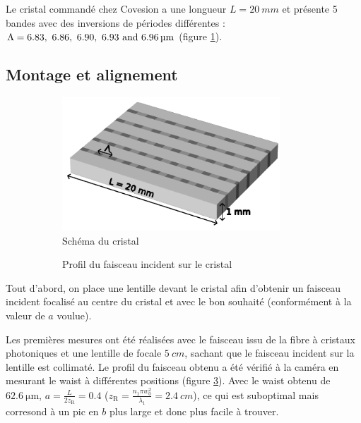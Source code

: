\documentclass[11pt,a4paper] { article}
\newcommand{\zr}{z_\mathsc{R}}
\newcommand{\mathsc}[1]{\mathrm{\scriptscriptstyle {#1}}}
\begin{document}
Le cristal commandé chez Covesion a une longueur $L=\SI{20}{mm}$ et présente 5 bandes avec des inversions de périodes différentes : $\Lambda = \qtylist[list-units = single]{6.83; 6.86 ; 6.90 ; 6.93 ; 6,96}{\micro\meter}$ (figure \ref{fig:sc}).

\subsection{Montage et alignement}  

\begin{figure}[htpb]
\centering
\hspace*{-0.8cm}
\begin{subfigure}[b]{0.48\textwidth}
	\centering
	\includegraphics[height=5cm]{./img/cristal.pdf}
	\vspace{0.8cm}
	\caption{Schéma du cristal}
	\label{fig:sc}
\end{subfigure}
\centering
\hspace*{0.4cm}
\begin{subfigure}[b]{0.48\textwidth}
    
	\vspace{-0.5cm}
    \caption{Profil du faisceau incident sur le cristal}
    \label{fig:wincident}
\end{subfigure}
\caption{}
\end{figure}

Tout d'abord, on place une lentille devant le cristal afin d'obtenir un faisceau incident focalisé au centre du cristal et avec le bon souhaité (conformément à la valeur de $a$ voulue).

Les premières mesures ont été réalisées avec le faisceau issu de la fibre à cristaux photoniques et une lentille de focale $\SI{5}{cm}$, sachant que le faisceau incident sur la lentille est collimaté. Le profil du faisceau obtenu a été vérifié à la caméra en mesurant le waist à différentes positions (figure \ref{fig:wincident}). Avec le waist obtenu de $\SI{62.6}{\micro\meter}$, $a=\frac{L}{2\zr}=0.4$ ($\zr = \frac{n_1 \pi w_0^2}{\lambda_1} = \SI{2.4}{cm}$), 
 ce qui est suboptimal mais corresond à un pic en $b$ plus large et donc plus facile à trouver.
\end{document}
